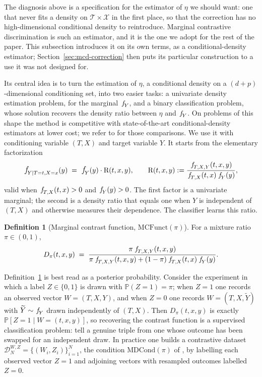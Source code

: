 \documentclass[11pt]{article}
\theoremstyle{plain}
\theoremstyle{definition}
\newtheorem{mydef}{Definition}
\theoremstyle{remark}
\newcommand{\MCF}{\ensuremath{\text{MCFunct}}}
\newcommand{\MDC}{\ensuremath{\text{MDCond}}}
\newcommand{\pP}{\ensuremath{\mathbb{P}}}
\newcommand{\cX}{\ensuremath{\mathcal{X}}}
\newcommand{\cT}{\ensuremath{\mathcal{T}}}
\newcommand{\pf}[1]{\ensuremath{\,\mathlarger{\textit{f}}_{#1}}}
\newcommand{\ratio}{\ensuremath{\pi}}
\newcommand{\contrast}{D_{\ratio}}
\newcommand{\DensityRatio}{\text{R}}
\newcommand{\mDwz}[1]{\ensuremath{\mathcal{D}}_{#1}^{W,Z}}
\begin{document}
The diagnosis above is a specification for the estimator of $\eta$ we should want: one that
never fits a density on $\cT\times\cX$ in the first place, so that the correction has no
high-dimensional conditional density to reintroduce. Marginal contrastive discrimination
\citep{meziani2025mcd} is such an estimator, and it is the one we adopt for the rest of the
paper. This subsection introduces it on its own terms, as a conditional-density estimator;
Section~\ref{sec:mcd-correction} then puts its particular construction to a use it was not
designed for.

Its central idea is to turn the estimation of $\eta$, a conditional density on a
$(d+p)$-dimensional conditioning set, into two easier tasks: a univariate density estimation
problem, for the marginal $\pf{Y}$, and a binary classification problem, whose solution
recovers the density ratio between $\eta$ and $\pf{Y}$. On problems of this shape the method
is competitive with state-of-the-art conditional-density estimators at lower cost; we refer to
\citet{meziani2025mcd} for those comparisons. We use it with conditioning variable $(T,X)$ and
target variable $Y$. It starts from the elementary factorization
\begin{equation}
\pf{Y \mid T=t,X=x}(y)
\;=\; \pf{Y}(y) \cdot \DensityRatio(t,x,y),
\qquad
\DensityRatio(t,x,y) := \frac{\pf{T,X,Y}(t,x,y)}{\pf{T,X}(t,x)\,\pf{Y}(y)} ,
\label{eq:reformulation}
\end{equation}
valid when $\pf{T,X}(t,x) > 0$ and $\pf{Y}(y) > 0$. The first factor is a univariate marginal;
the second is a density ratio that equals one when $Y$ is independent of $(T,X)$ and otherwise
measures their dependence. The classifier learns this ratio.

\begin{mydef}[Marginal contrast function, $\MCF(\ratio)$]
\label{def:MCF}
For a mixture ratio $\ratio \in (0,1)$,
\begin{equation}
\contrast(t,x,y)
\;=\; \frac{\ratio\,\pf{T,X,Y}(t,x,y)}
{\ratio\,\pf{T,X,Y}(t,x,y) + (1-\ratio)\,\pf{T,X}(t,x)\,\pf{Y}(y)} .
\label{eq:contrast}
\end{equation}
\end{mydef}

Definition~\ref{def:MCF} is best read as a posterior probability. Consider the experiment in
which a label $Z\in\{0,1\}$ is drawn with $\pP(Z=1)=\ratio$; when $Z=1$ one records an
observed vector $W=(T,X,Y)$, and when $Z=0$ one records $W=(T,X,\widetilde Y)$ with
$\widetilde Y \sim \pf{Y}$ drawn independently of $(T,X)$. Then $\contrast(t,x,y)$ is exactly
$\pP[Z=1 \mid W=(t,x,y)]$, so recovering the contrast function is a supervised classification
problem: tell a genuine triple from one whose outcome has been swapped for an independent
draw. In practice one builds a contrastive dataset
$\mDwz{N}=\{(W_i,Z_i)\}_{i=1}^{N}$, the condition $\MDC(\ratio)$ of \citet{meziani2025mcd},
by labelling each observed vector $Z=1$ and adjoining vectors with resampled outcomes
labelled $Z=0$.
\end{document}
